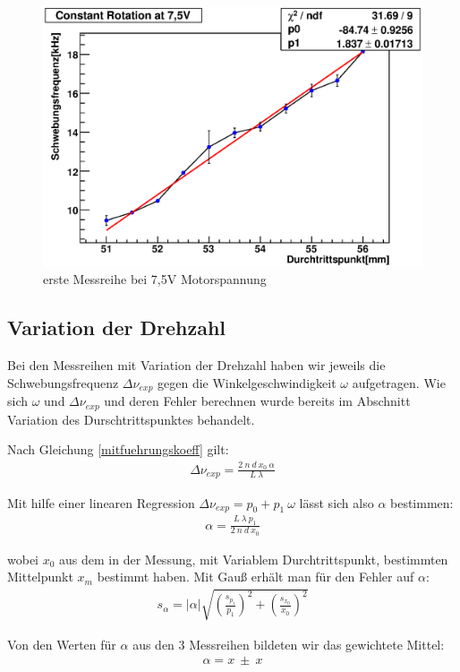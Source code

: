 \documentclass[12pt]{article}
\begin{document}
\begin{figure}[H]  
\centering
\includegraphics[width=0.7\linewidth]{pictures/7,5V1.eps}
\caption{erste Messreihe bei 7,5V Motorspannung}
\label{versuchsaufbau}
\end{figure}

\subsection{Variation der Drehzahl}
Bei den Messreihen mit Variation der Drehzahl haben wir jeweils die Schwebungsfrequenz $\Delta\nu_{exp}$ gegen die Winkelgeschwindigkeit $\omega$
aufgetragen. Wie sich $\omega$ und $\Delta\nu_{exp}$ und deren Fehler berechnen wurde bereits im Abschnitt Variation des Durschtrittspunktes behandelt.

Nach Gleichung \ref{mitfuehrungskoeff} gilt:
\begin{align}
 \Delta\nu_{exp} = \frac{2 \ n \ d \ x_0 \ \alpha}{L \ \lambda}
\end{align}

Mit hilfe einer linearen Regression $\Delta\nu_{exp} = p_0 + p_1 \ \omega$ lässt sich also $\alpha$ bestimmen:
\begin{align}
 \alpha = \frac{L \ \lambda \ p_1}{2 \ n \ d \ x_0}
\end{align}

wobei $x_0$ aus dem in der Messung, mit Variablem Durchtrittspunkt, bestimmten Mittelpunkt $x_m$ bestimmt haben.
Mit Gauß erhält man für den Fehler auf $\alpha$:
\begin{align}
 s_{\alpha} = \lvert \alpha \rvert \sqrt{\left(\frac{s_{p_1}}{p_1}\right)^2 + \left(\frac{s_{x_0}}{x_0}\right)^2}
\end{align}

Von den Werten für $\alpha$ aus den 3 Messreihen bildeten wir das gewichtete Mittel:
\begin{align}
 \alpha = x \ \pm \ x
\end{align}
\end{document}

